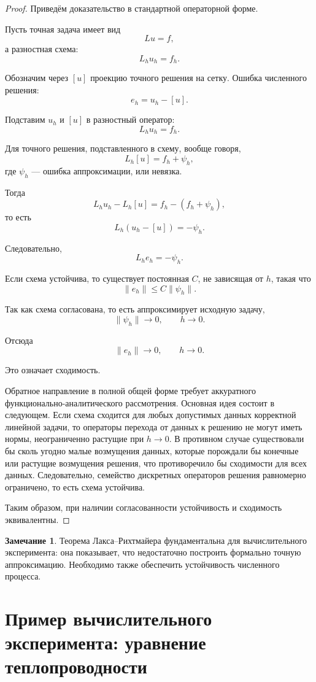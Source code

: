 \documentclass[12pt,a4paper]{article}
\theoremstyle{definition}
\newtheorem{remark}{Замечание}
\theoremstyle{plain}
\begin{document}
\begin{proof}
Приведём доказательство в стандартной операторной форме.

Пусть точная задача имеет вид
\[
Lu=f,
\]
а разностная схема:
\[
L_h u_h = f_h.
\]

Обозначим через $[u]$ проекцию точного решения на сетку. Ошибка численного решения:
\[
e_h = u_h - [u].
\]

Подставим $u_h$ и $[u]$ в разностный оператор:
\[
L_h u_h = f_h.
\]

Для точного решения, подставленного в схему, вообще говоря,
\[
L_h [u] = f_h + \psi_h,
\]
где $\psi_h$ --- ошибка аппроксимации, или невязка.

Тогда
\[
L_h u_h - L_h [u] = f_h - (f_h+\psi_h),
\]
то есть
\[
L_h (u_h-[u]) = -\psi_h.
\]

Следовательно,
\[
L_h e_h = -\psi_h.
\]

Если схема устойчива, то существует постоянная $C$, не зависящая от $h$, такая что
\[
\|e_h\| \le C\|\psi_h\|.
\]

Так как схема согласована, то есть аппроксимирует исходную задачу,
\[
\|\psi_h\| \to 0,
\qquad h\to 0.
\]

Отсюда
\[
\|e_h\| \to 0,
\qquad h\to 0.
\]

Это означает сходимость.

Обратное направление в полной общей форме требует аккуратного функционально-аналитического рассмотрения. Основная идея состоит в следующем. Если схема сходится для любых допустимых данных корректной линейной задачи, то операторы перехода от данных к решению не могут иметь нормы, неограниченно растущие при $h\to0$. В противном случае существовали бы сколь угодно малые возмущения данных, которые порождали бы конечные или растущие возмущения решения, что противоречило бы сходимости для всех данных. Следовательно, семейство дискретных операторов решения равномерно ограничено, то есть схема устойчива.

Таким образом, при наличии согласованности устойчивость и сходимость эквивалентны.
\end{proof}

\begin{remark}
Теорема Лакса--Рихтмайера фундаментальна для вычислительного эксперимента: она показывает, что недостаточно построить формально точную аппроксимацию. Необходимо также обеспечить устойчивость численного процесса.
\end{remark}

\section{Пример вычислительного эксперимента: уравнение теплопроводности}
\end{document}
